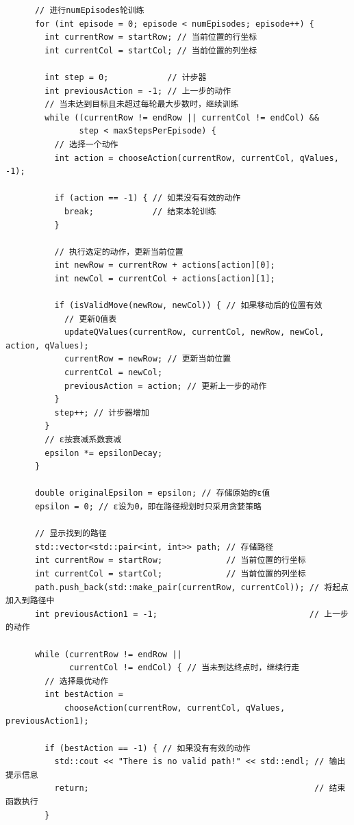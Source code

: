 \documentclass[UTF8,titlepage]{ctexart}
\numberwithin{figure}{section}
\begin{document}
\begin{verbatim}
      // 进行numEpisodes轮训练
      for (int episode = 0; episode < numEpisodes; episode++) {
        int currentRow = startRow; // 当前位置的行坐标
        int currentCol = startCol; // 当前位置的列坐标
    
        int step = 0;            // 计步器
        int previousAction = -1; // 上一步的动作
        // 当未达到目标且未超过每轮最大步数时，继续训练
        while ((currentRow != endRow || currentCol != endCol) &&
               step < maxStepsPerEpisode) {
          // 选择一个动作
          int action = chooseAction(currentRow, currentCol, qValues, -1);
    
          if (action == -1) { // 如果没有有效的动作
            break;            // 结束本轮训练
          }
    
          // 执行选定的动作，更新当前位置
          int newRow = currentRow + actions[action][0];
          int newCol = currentCol + actions[action][1];
    
          if (isValidMove(newRow, newCol)) { // 如果移动后的位置有效
            // 更新Q值表
            updateQValues(currentRow, currentCol, newRow, newCol, action, qValues);
            currentRow = newRow; // 更新当前位置
            currentCol = newCol;
            previousAction = action; // 更新上一步的动作
          }
          step++; // 计步器增加
        }
        // ε按衰减系数衰减
        epsilon *= epsilonDecay;
      }
    
      double originalEpsilon = epsilon; // 存储原始的ε值
      epsilon = 0; // ε设为0，即在路径规划时只采用贪婪策略
    
      // 显示找到的路径
      std::vector<std::pair<int, int>> path; // 存储路径
      int currentRow = startRow;             // 当前位置的行坐标
      int currentCol = startCol;             // 当前位置的列坐标
      path.push_back(std::make_pair(currentRow, currentCol)); // 将起点加入到路径中
      int previousAction1 = -1;                               // 上一步的动作
    
      while (currentRow != endRow ||
             currentCol != endCol) { // 当未到达终点时，继续行走
        // 选择最优动作
        int bestAction =
            chooseAction(currentRow, currentCol, qValues, previousAction1);
    
        if (bestAction == -1) { // 如果没有有效的动作
          std::cout << "There is no valid path!" << std::endl; // 输出提示信息
          return;                                              // 结束函数执行
        }
    

\end{verbatim}
\end{document}
